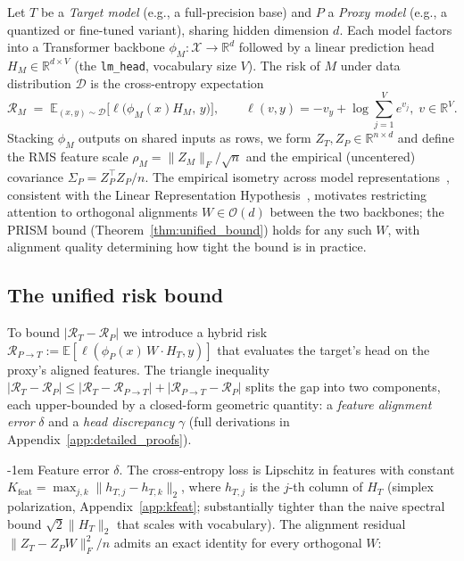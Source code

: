 \documentclass{article} %
\makeatletter
\newlength{\paraSpace}
\renewcommand{\paragraph}{\@startsection{paragraph}{4}{\z@}%
  {\paraSpace}{-1em}%
  {\normalfont\normalsize\bfseries}}
\makeatother
\begin{document}
Let $T$ be a \emph{Target model} (e.g., a full-precision base) and $P$ a \emph{Proxy model} (e.g., a quantized or fine-tuned variant), sharing hidden dimension $d$. Each model factors into a Transformer backbone $\phi_M: \mathcal{X} \to \mathbb{R}^d$ followed by a linear prediction head $H_M \in \mathbb{R}^{d \times V}$ (the \texttt{lm\_head}, vocabulary size $V$). The risk of $M$ under data distribution $\mathcal{D}$ is the cross-entropy expectation
\begin{equation}
\label{eq:ce_def}
\mathcal{R}_M \;=\; \mathbb{E}_{(x,y) \sim \mathcal{D}}\!\big[\ell\big(\phi_M(x) H_M,\, y\big)\big], \qquad \ell(v, y) = -v_y + \log \textstyle\sum_{j=1}^{V} e^{v_j}, \; v \in \mathbb{R}^V.
\end{equation}
Stacking $\phi_M$ outputs on shared inputs as rows, we form $Z_T, Z_P \in \mathbb{R}^{n \times d}$ and define the RMS feature scale $\rho_M = \|Z_M\|_F/\sqrt{n}$ and the empirical (uncentered) covariance $\Sigma_P = Z_P^\top Z_P/n$. The empirical isometry across model representations~\citep{moschella2022relative}, consistent with the Linear Representation Hypothesis~\citep{park2023linear}, motivates restricting attention to orthogonal alignments $W \in \mathcal{O}(d)$ between the two backbones; the PRISM bound (Theorem~\ref{thm:unified_bound}) holds for any such $W$, with alignment quality determining how tight the bound is in practice.


\subsection{The unified risk bound}
\label{subsec:unified_bound}

To bound $|\mathcal{R}_T - \mathcal{R}_P|$ we introduce a hybrid risk $\mathcal{R}_{P \to T} := \mathbb{E}[\ell(\phi_P(x)\,W \cdot H_T, y)]$ that evaluates the target's head on the proxy's aligned features. The triangle inequality $|\mathcal{R}_T - \mathcal{R}_P| \le |\mathcal{R}_T - \mathcal{R}_{P\to T}| + |\mathcal{R}_{P\to T} - \mathcal{R}_P|$ splits the gap into two components, each upper-bounded by a closed-form geometric quantity: a \emph{feature alignment error} $\delta$ and a \emph{head discrepancy} $\gamma$ (full derivations in Appendix~\ref{app:detailed_proofs}).

\paragraph{Feature error $\delta$.}
The cross-entropy loss is Lipschitz in features with constant $K_{\mathrm{feat}} = \max_{j,k}\|h_{T,j}-h_{T,k}\|_2$, where $h_{T,j}$ is the $j$-th column of $H_T$ (simplex polarization, Appendix~\ref{app:kfeat}; substantially tighter than the naive spectral bound $\sqrt{2}\|H_T\|_2$ that scales with vocabulary). The alignment residual $\|Z_T - Z_P W\|_F^2 / n$ admits an exact identity for every orthogonal $W$:
\end{document}
